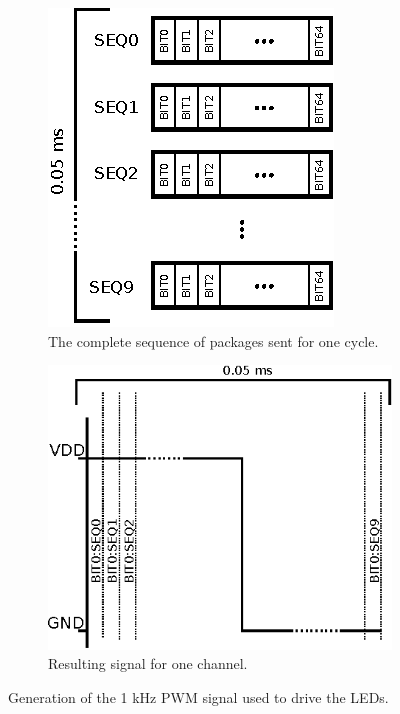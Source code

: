 \begin{figure}[H]
	\begin{subfigure}[t]{.49\linewidth}
		\centering
		\includegraphics[width=.65\linewidth]{images/bit64}
		\caption{The complete sequence of packages sent for one cycle.}
		\label{fig:bit64}
	\end{subfigure}
	\begin{subfigure}[t]{.49\linewidth}
		\includegraphics[width=\linewidth]{images/bitonegraph}
		\caption{Resulting signal for one channel.}
		\label{fig:bitone}
	\end{subfigure}
	\caption{Generation of the 1 kHz PWM signal used to drive the LEDs.}
	\label{fig:pwmsequence}
\end{figure}

